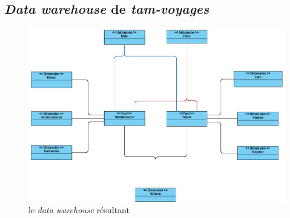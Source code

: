 \documentclass[a4paper,12pt]{report}
\begin{document}
\subsection*{\textit{Data warehouse} de \textit{tam-voyages}}
\label{subsec:data_warehouse}
\begin{figure}[!ht]
  \centering
  \includegraphics[scale=0.6]{images/data_warehouse.png}
  \caption{le \textit{data warehouse} résultant}
\end{figure}

\newpage
\end{document}
